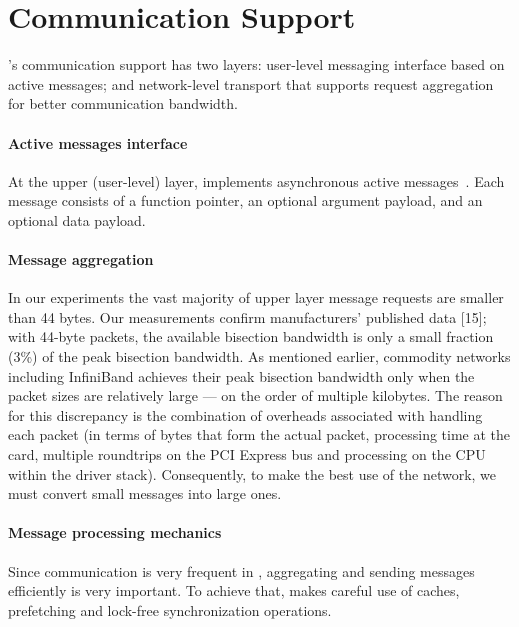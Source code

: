 \section{Communication Support}
\label{sec:communication}

\Grappa's communication support has two layers: user-level messaging interface
based on active messages; and network-level transport that supports request
aggregation for better communication bandwidth.


\paragraph{Active messages interface} At the upper (user-level) layer, \Grappa
implements asynchronous active messages~\cite{vonEicken92}. Each message
consists of a function pointer, an optional argument payload, and an optional
data payload. 


\paragraph{Message aggregation} In our experiments the vast majority of upper
layer message requests are smaller than 44 bytes. Our measurements confirm
manufacturers' published data [15]; with 44-byte packets, the available
bisection bandwidth is only a small fraction (3\%) of the peak bisection
bandwidth. As mentioned earlier, commodity networks including InfiniBand
achieves their peak bisection bandwidth only when the packet sizes are
relatively large --- on the order of multiple kilobytes. The reason for this
discrepancy is the combination of overheads associated with handling each
packet (in terms of bytes that form the actual packet, processing time at the
card, multiple roundtrips on the PCI Express bus and processing on the CPU
within the driver stack). Consequently, to make the best use of the network,
we must convert small messages into large ones.

\paragraph{Message processing mechanics} Since communication is very frequent
in \Grappa, aggregating and sending messages efficiently is very important. To
achieve that, \Grappa makes careful use of caches, prefetching and lock-free
synchronization operations. 

